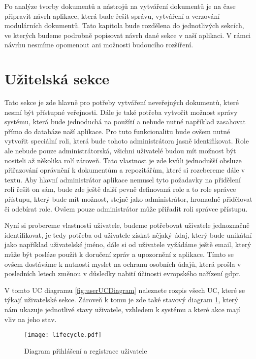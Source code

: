 Po analýze tvorby dokumentů a nástrojů na vytváření dokumentů je na čase připravit návrh aplikace, která bude řešit správu, vytváření a verzování
modulárních dokumentů. Tato kapitola bude rozdělena do jednotlivých sekcích, ve kterých budeme podrobně popisovat návrh dané sekce v naší aplikaci.
V rámci návrhu nesmíme opomenout ani možnosti budoucího rozšíření.

\section{Užitelská sekce}

Tato sekce je zde hlavně pro potřeby vytváření neveřejných dokumentů, které nesmí být přístupné veřejnosti. Dále je také potřeba vytvořit možnost
správy systému, která bude jednoduchá na použítí a nebude nutné například zasahovat přímo do databáze naší aplikace. Pro tuto funkcionalitu bude ovšem
nutné vytvořit speciální roli, která bude tohoto administrátora jasně identifikovat. Role ale nebude pouze administrátorská, všichni uživatelé budou mít
možnost být nositeli až několika rolí zároveň. Tato vlastnost je zde kvůli jednodušší obsluze přiřazování oprávnění k dokumentům a repozitářům, které si rozebereme
dále v textu. Aby hlavní administrátor aplikace nemusel tyto požadavky na přidělení rolí řešit on sám, bude zde ještě další pevně definovaná role a to role
správce přístupu, který bude mít možnost, stejně jako administrátor, hromadně přidělovat či odebírat role. Ovšem pouze administrátor může přiřadit roli správce přístupu.

Nyní si probereme vlastnosti uživatele, budeme potřebovat uživatele jednoznačně identifikovat, je tedy potřeba od uživatele získat nějaký údaj, který bude unikátní
jako například uživatelské jméno, dále si od uživatele vyžádáme ještě email, který může být posléze použit k doručení zpráv a upozornění z aplikace. Tímto se ovšem
dostáváme k nutnosti myslet na ochranu osobních údajů, která prošla v posledních letech změnou v důsledky nabití účinosti evropského nařízení \gls{gdpr}.

V tomto UC diagramu \ref{fig:userUCDiagram} naleznete rozpis všech UC, které se týkají uživatelské sekce. Zároveň k tomu je zde také stavový diagram \ref{fig:userFlow},
který nám ukazuje jednotlivé stavy uživatele, vzhledem k systému a které akce mají vliv na jeho stav.

\begin{figure}[H]
    \centering
    \texttt{[image: lifecycle.pdf]}
    \caption{Diagram přihlášení a registrace uživatele}
    \label{fig:userFlow}
\end{figure}

